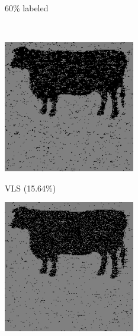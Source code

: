 \documentclass{article}
\begin{document}
\begin{figure}[htb]
\begin{minipage}[b]{0.30\linewidth}
      \centerline{60\% labeled }\medskip
    \end{minipage}
    \\
    \begin{minipage}[b]{0.30\linewidth}
        \centering
        \centerline{\includegraphics[width=\textwidth,cfbox=black 1pt 0pt]{ress/cow40/cow40_vsl.png}}
        \centerline{VLS (15.64\%)}\medskip      \end{minipage}
      \hfill
      \begin{minipage}[b]{.30\linewidth}
        \centering
        \centerline{\includegraphics[width=\textwidth,cfbox=black 1pt 0pt]{ress/cow40/cow40_svrnn_2.png}}

\end{minipage}
\end{figure}
\end{document}
